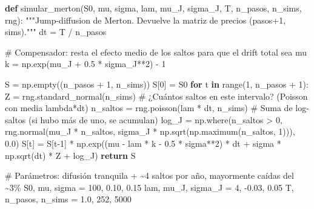 \documentclass[
  spanish,
  letterpaper,
  DIV=11,
  numbers=noendperiod]{scrreprt}
\newenvironment{Shaded}{\begin{snugshade}}{\end{snugshade}}
\newcommand{\BuiltInTok}[1]{\textcolor[rgb]{0.00,0.23,0.31}{#1}}
\newcommand{\CommentTok}[1]{\textcolor[rgb]{0.37,0.37,0.37}{#1}}
\newcommand{\ControlFlowTok}[1]{\textcolor[rgb]{0.00,0.23,0.31}{\textbf{#1}}}
\newcommand{\DecValTok}[1]{\textcolor[rgb]{0.68,0.00,0.00}{#1}}
\newcommand{\FloatTok}[1]{\textcolor[rgb]{0.68,0.00,0.00}{#1}}
\newcommand{\KeywordTok}[1]{\textcolor[rgb]{0.00,0.23,0.31}{\textbf{#1}}}
\newcommand{\NormalTok}[1]{\textcolor[rgb]{0.00,0.23,0.31}{#1}}
\newcommand{\OperatorTok}[1]{\textcolor[rgb]{0.37,0.37,0.37}{#1}}
\begin{document}
\label{merton}
\begin{Shaded}
\begin{Highlighting}[]
\KeywordTok{def}\NormalTok{ simular\_merton(S0, mu, sigma, lam, mu\_J, sigma\_J, T, n\_pasos, n\_sims, rng):}
    \CommentTok{"""Jump{-}diffusion de Merton. Devuelve la matriz de precios (pasos+1, sims)."""}
\NormalTok{    dt }\OperatorTok{=}\NormalTok{ T }\OperatorTok{/}\NormalTok{ n\_pasos}

    \CommentTok{\# Compensador: resta el efecto medio de los saltos para que el drift total sea mu}
\NormalTok{    k }\OperatorTok{=}\NormalTok{ np.exp(mu\_J }\OperatorTok{+} \FloatTok{0.5} \OperatorTok{*}\NormalTok{ sigma\_J}\OperatorTok{**}\DecValTok{2}\NormalTok{) }\OperatorTok{{-}} \DecValTok{1}

\NormalTok{    S }\OperatorTok{=}\NormalTok{ np.empty((n\_pasos }\OperatorTok{+} \DecValTok{1}\NormalTok{, n\_sims))}
\NormalTok{    S[}\DecValTok{0}\NormalTok{] }\OperatorTok{=}\NormalTok{ S0}
    \ControlFlowTok{for}\NormalTok{ t }\KeywordTok{in} \BuiltInTok{range}\NormalTok{(}\DecValTok{1}\NormalTok{, n\_pasos }\OperatorTok{+} \DecValTok{1}\NormalTok{):}
\NormalTok{        Z }\OperatorTok{=}\NormalTok{ rng.standard\_normal(n\_sims)}
        \CommentTok{\# ¿Cuántos saltos en este intervalo? (Poisson con media lambda*dt)}
\NormalTok{        n\_saltos }\OperatorTok{=}\NormalTok{ rng.poisson(lam }\OperatorTok{*}\NormalTok{ dt, n\_sims)}
        \CommentTok{\# Suma de log{-}saltos (si hubo más de uno, se acumulan)}
\NormalTok{        log\_J }\OperatorTok{=}\NormalTok{ np.where(n\_saltos }\OperatorTok{\textgreater{}} \DecValTok{0}\NormalTok{,}
\NormalTok{                         rng.normal(mu\_J }\OperatorTok{*}\NormalTok{ n\_saltos, sigma\_J }\OperatorTok{*}\NormalTok{ np.sqrt(np.maximum(n\_saltos, }\DecValTok{1}\NormalTok{))),}
                         \FloatTok{0.0}\NormalTok{)}
\NormalTok{        S[t] }\OperatorTok{=}\NormalTok{ S[t}\OperatorTok{{-}}\DecValTok{1}\NormalTok{] }\OperatorTok{*}\NormalTok{ np.exp((mu }\OperatorTok{{-}}\NormalTok{ lam }\OperatorTok{*}\NormalTok{ k }\OperatorTok{{-}} \FloatTok{0.5} \OperatorTok{*}\NormalTok{ sigma}\OperatorTok{**}\DecValTok{2}\NormalTok{) }\OperatorTok{*}\NormalTok{ dt}
                               \OperatorTok{+}\NormalTok{ sigma }\OperatorTok{*}\NormalTok{ np.sqrt(dt) }\OperatorTok{*}\NormalTok{ Z }\OperatorTok{+}\NormalTok{ log\_J)}
    \ControlFlowTok{return}\NormalTok{ S}

\CommentTok{\# Parámetros: difusión tranquila + \textasciitilde{}4 saltos por año, mayormente caídas del \textasciitilde{}3\%}
\NormalTok{S0, mu, sigma }\OperatorTok{=} \DecValTok{100}\NormalTok{, }\FloatTok{0.10}\NormalTok{, }\FloatTok{0.15}
\NormalTok{lam, mu\_J, sigma\_J }\OperatorTok{=} \DecValTok{4}\NormalTok{, }\OperatorTok{{-}}\FloatTok{0.03}\NormalTok{, }\FloatTok{0.05}
\NormalTok{T, n\_pasos, n\_sims }\OperatorTok{=} \FloatTok{1.0}\NormalTok{, }\DecValTok{252}\NormalTok{, }\DecValTok{5000}


\end{Highlighting}
\end{Shaded}
\end{document}
